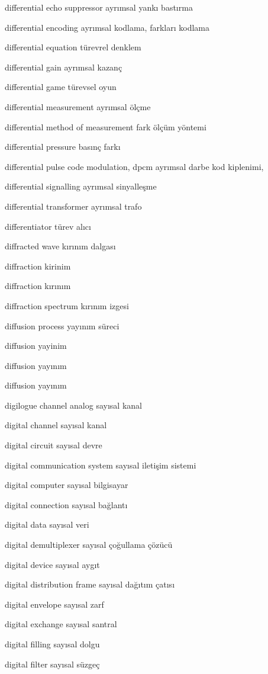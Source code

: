 \documentclass[12pt,fleqn]{article}\usepackage{../../common}
\begin{document}
differential echo suppressor ayrımsal yankı bastırma

differential encoding ayrımsal kodlama, farkları kodlama

differential equation türevrel denklem

differential gain ayrımsal kazanç

differential game türevsel oyun

differential measurement ayrımsal ölçme

differential method of measurement fark ölçüm yöntemi

differential pressure basınç farkı

differential pulse code modulation, dpcm ayrımsal darbe kod kiplenimi,

differential signalling ayrımsal sinyalleşme

differential transformer ayrımsal trafo

differentiator türev alıcı

diffracted wave kırınım dalgası

diffraction kirinim

diffraction kırınım

diffraction spectrum kırınım izgesi

diffusion process yayınım süreci

diffusion yayinim

diffusion yayınım

diffusion yayınım

digilogue channel analog sayısal kanal

digital channel sayısal kanal

digital circuit sayısal devre

digital communication system sayısal iletişim sistemi

digital computer sayısal bilgisayar

digital connection sayısal bağlantı

digital data sayısal veri

digital demultiplexer sayısal çoğullama çözücü

digital device sayısal aygıt

digital distribution frame sayısal dağıtım çatısı

digital envelope sayısal zarf

digital exchange sayısal santral

digital filling sayısal dolgu

digital filter sayısal süzgeç
\end{document}
